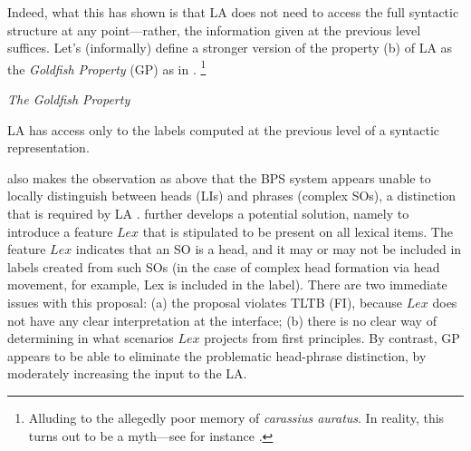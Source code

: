 Indeed, what this has shown is that LA  does not need to access the full syntactic structure at any point---rather, the information given at the previous level suffices. Let's (informally) define a stronger version of the property (b) of LA as the \textit{Goldfish Property} (GP) as in .%
\footnote{Alluding to the allegedly poor memory of \textit{carassius auratus}. In reality, this turns out to be a myth---see for instance \textcite{GeeP.etal_1994}.}

\begin{example}\label{def:gp}
    \textit{The Goldfish Property}

    LA has access only to the labels computed at the previous level of a syntactic representation.
\end{example}

\textcite[f.n.~6]{RizziL_2015} also makes the observation as above that the BPS system appears unable to locally distinguish between heads (LIs) and phrases (complex SOs), a distinction that is required by LA . \textcite{RizziL_2016} further develops a potential solution, namely to introduce a feature $Lex$ that is stipulated to be present on all lexical items. The feature $Lex$ indicates that an SO is a head, and it may or may not be included in labels created from such SOs (in the case of complex head formation via head movement, for example, Lex is included in the label). There are two immediate issues with this proposal: (a) the proposal violates TLTB (FI), because $Lex$ does not have any clear interpretation at the interface; (b) there is no clear way of determining in what scenarios $Lex$ projects from first principles. By contrast, GP appears to be able to eliminate the problematic head-phrase distinction, by moderately increasing the input to the LA.
